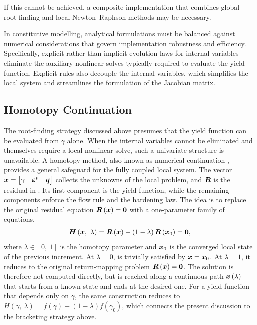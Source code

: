 If this cannot be achieved, a composite implementation that combines global root-finding and local Newton--Raphson methods may be necessary.

In constitutive modelling, analytical formulations must be balanced against numerical considerations that govern implementation robustness and efficiency.
Specifically, explicit rather than implicit evolution laws for internal variables eliminate the auxiliary nonlinear solves typically required to evaluate the yield function.
Explicit rules also decouple the internal variables, which simplifies the local system and streamlines the formulation of the Jacobian matrix.
\subsection{Homotopy Continuation}
The root-finding strategy discussed above presumes that the yield function can be evaluated from $\gamma$ alone.
When the internal variables cannot be eliminated and themselves require a local nonlinear solve, such a univariate structure is unavailable.
A homotopy method, also known as numerical continuation \cite{Allgower1990}, provides a general safeguard for the fully coupled local system.
The vector $\bm{x}=\begin{bmatrix}\gamma&\bm{\varepsilon}^p&\bm{q}\end{bmatrix}$ collects the unknowns of the local problem, and $\bm{R}$ is the residual in .
Its first component is the yield function, while the remaining components enforce the flow rule and the hardening law.
The idea is to replace the original residual equation $\bm{R}\left(\bm{x}\right)=\bm{0}$ with a one-parameter family of equations,
\begin{gather}\label{eq:homotopy}
\bm{H}\left(\bm{x},~\lambda\right)=\bm{R}\left(\bm{x}\right)-\left(1-\lambda\right)\bm{R}\left(\bm{x}_0\right)=\bm{0},
\end{gather}
where $\lambda\in\left[0,~1\right]$ is the homotopy parameter and $\bm{x}_0$ is the converged local state of the previous increment.
At $\lambda=0$,  is trivially satisfied by $\bm{x}=\bm{x}_0$.
At $\lambda=1$, it reduces to the original return-mapping problem $\bm{R}\left(\bm{x}\right)=\bm{0}$.
The solution is therefore not computed directly, but is reached along a continuous path $\bm{x}\left(\lambda\right)$ that starts from a known state and ends at the desired one.
For a yield function that depends only on $\gamma$, the same construction reduces to $H\left(\gamma,~\lambda\right)=f\left(\gamma\right)-\left(1-\lambda\right)f\left(\gamma_0\right)$, which connects the present discussion to the bracketing strategy above.

